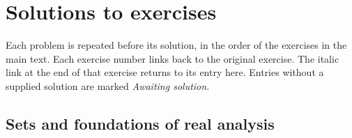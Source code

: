 \chapter{Solutions to exercises}
\label{ch:appendix:exercise-solutions}

Each problem is repeated before its solution, in the order of the exercises
in the main text. Each exercise number links back to the original exercise.
The italic link at the end of that exercise returns to its entry here.
Entries without a supplied solution are marked \emph{Awaiting solution.}

\section{Sets and foundations of real analysis}
\label{sec:appendix:foundations-solutions}

\begin{restatedproblem}
  
\end{restatedproblem}


\begin{restatedproblem}
  
\end{restatedproblem}


\begin{restatedproblem}
  
\end{restatedproblem}


\begin{restatedproblem}
  
\end{restatedproblem}


\begin{restatedproblem}
  
\end{restatedproblem}


\begin{restatedproblem}
  
\end{restatedproblem}


